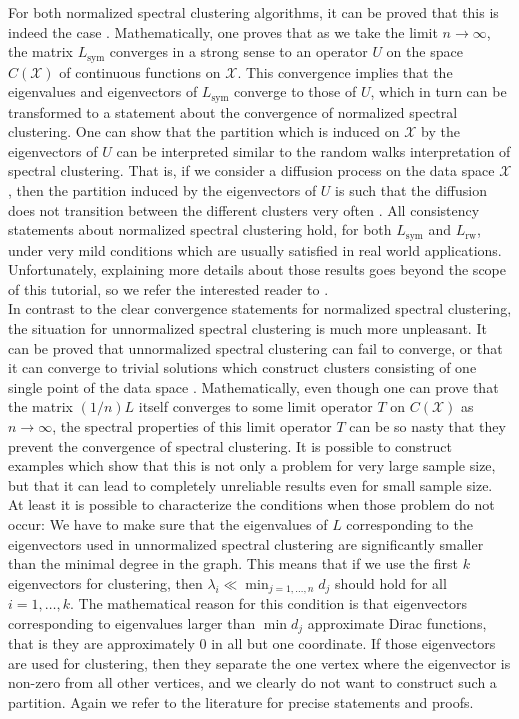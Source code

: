 \documentclass{article}
\newcommand{\Xcal}{\mathcal{X}}
\newcommand{\Lun}{L}
\newcommand{\Lsym}{L_{\text{sym}}}
\newcommand{\Lrw}{L_{\text{rw}}}
\begin{document}
For both normalized spectral clustering algorithms, it can be proved
that this is indeed the case
\cite{LuxBouBel04_colt,LuxBouBel04_nips,LuxBelBou_annofstats}. Mathematically,
one proves that as we take the limit $n \to \infty$, the matrix
$\Lsym$ converges in a strong sense to an operator $U$ on the space
$C(\Xcal)$ of continuous functions on $\Xcal$. This convergence
implies that the eigenvalues and eigenvectors of $\Lsym$ converge to
those of $U$, which in turn can be transformed to a statement about
the convergence of normalized spectral clustering. One can show that
the partition which is induced on $\Xcal$ by the eigenvectors of $U$
can be interpreted similar to the random walks interpretation of
spectral clustering. That is, if we consider a diffusion process on
the data space $\Xcal$, then the partition induced by the eigenvectors
of $U$ is such that the diffusion does not transition between the
different clusters very often \cite{LuxBouBel04_colt}. All consistency
statements about normalized spectral clustering hold, for both $\Lsym$
and $\Lrw$, under very mild conditions which are usually satisfied in
real world applications. Unfortunately, explaining more details about
those results goes beyond the scope of this tutorial, so we refer the
interested reader to .\\

In contrast to the clear convergence statements for normalized
spectral clustering, the situation for unnormalized spectral
clustering is much more unpleasant.  It can be proved that
unnormalized spectral clustering can fail to converge, or that it can
converge to trivial solutions which construct clusters consisting of
one single point of the data space \cite{LuxBouBel04_nips,LuxBelBou_annofstats}. 
Mathematically, even though one can prove that the
matrix $(1/n)\Lun$ itself converges to some limit operator $T$ on
$C(\Xcal)$ as $n \to \infty$, the spectral properties of this limit
operator $T$ can be so nasty that they prevent the convergence of
spectral clustering. It is possible to construct examples
which show that this is not only a problem for very large sample size,
but that it can lead to completely unreliable results even for small sample
size. At least it is possible to characterize the conditions when
those problem do not occur: We have to make sure that the eigenvalues
of $\Lun$ corresponding to the eigenvectors used in unnormalized
spectral clustering are significantly smaller than the minimal degree in the
graph. This means that if we use the first $k$ eigenvectors for
clustering, then $\lambda_i \ll \min_{j=1,\hdots,n} d_j$ should hold
for all $i=1,\hdots,k$.  The mathematical reason for this condition is
that eigenvectors corresponding to eigenvalues larger than $\min d_j$
approximate Dirac functions, that is they are approximately 0 in all
but one coordinate. If those eigenvectors are used for clustering,
then they separate the one vertex where the eigenvector is non-zero
from all other vertices, and we clearly do not want to construct such
a partition. Again we refer to the literature for precise statements
and proofs.\\
\end{document}
